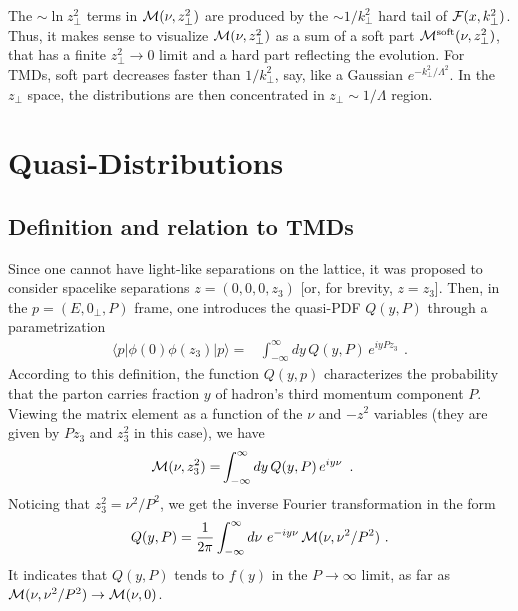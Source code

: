 \documentclass[aps,prd,twocolumn,showpacs,preprintnumbers,superscriptaddress,groupedaddress]{revtex4-1}
\begin{document}
 

The   \mbox{$\sim \ln z_\perp^2$}  terms 
in   $ {\cal M} (\nu,  z_\perp^2) $ are 
produced by  the  $\sim 1/k_\perp^2$ hard tail of ${\cal  F} (x, k_\perp^2)$.
Thus,  it makes sense to visualize 
$ {\cal M} (\nu, z_\perp^2)  $   as a sum of a soft part $ {\cal M}^{\rm soft} (\nu, z_\perp^2)$, 
that has a finite $z_\perp^2\to 0$ limit  
and a  hard part     reflecting   the evolution. 
For   TMDs,    soft part  decreases faster  than $1/k_\perp^2$, say, like 
a Gaussian $e^{-k_\perp^2/\Lambda^2}$.   In  the  $z_\perp$  space, the distributions
are then concentrated in  \mbox{$z_\perp \sim 1/\Lambda$}  region. 

\section{Quasi-Distributions} 




\subsection{Definition and relation to TMDs}



Since one cannot have light-like separations on the lattice,
it was proposed  \cite{Ji:2013dva}  to consider 
spacelike separations  
$z= (0,0,0,z_3)$ [or, for brevity, \mbox{$z=z_3$}]. Then, 
 in  the   \mbox{$p=(E, 0_\perp, P)$}  frame,
 one  introduces the quasi-PDF  $Q(y, P)$    through a parametrization  
  \begin{align}
  \langle p |   \phi(0) \phi (z_3)|p \rangle %
=  & 
\int_{-\infty}^{\infty}   dy \, 
 Q(y, P) \,  e^{i y  P z_3 } \, 
 \  . 
 \label{newVDFxzQ}
\end{align} 
According to  this definition, the function $Q(y,p)$ characterizes  the probability 
that  the  parton  carries fraction $y$ of hadron's third momentum
component $P$.  Viewing  the matrix element as a function 
of the $\nu$ and $-z^2$ variables
(they are given by $Pz_3$ and $z_3^2$ in this case), we have 
 \begin{align}
{\cal M} (\nu,z_3^2) 
=  & 
\int_{-\infty}^{\infty}   dy \, 
 Q(y, P) \,  e^{i y  \nu } \, 
 \  . 
 \label{newVDFxzQ}
\end{align} 
Noticing that $z_3^2= \nu^2/P^2$, we get  the inverse  Fourier transformation 
in the form 
\begin{align} 
  Q(y,  P)   =\frac{1}{2 \pi}  \int_{-\infty}^{\infty}  d\nu \, 
   \, e^{-i y  \nu}  \, {\cal M} (\nu,  \nu^2/P^2)    \  .
\label{IxM}
\end{align}  
It 
indicates  that $  Q(y,  P)  $  tends to $f(y)$  in the 
$P \to \infty$  limit,  as far as    ${\cal M} (\nu,  \nu^2/P^2) \to {\cal M} (\nu, 0)$.
\end{document}
